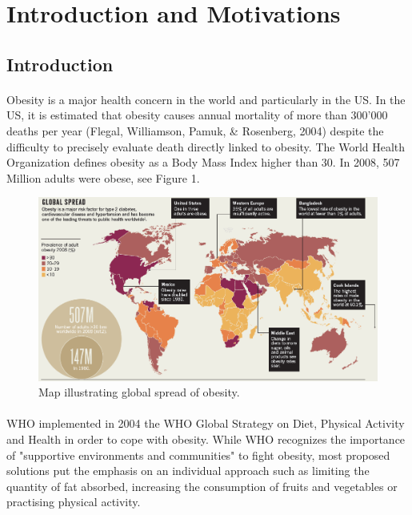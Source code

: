 \documentclass[11pt]{article}
\begin{document}
\section{Introduction and Motivations}

\subsection{Introduction}
\paragraph{}
Obesity is a major health concern in the world and particularly in the US. In the US, it is estimated that obesity causes annual mortality of more than 300'000 deaths per year (Flegal, Williamson, Pamuk, \& Rosenberg, 2004) despite the difficulty to precisely evaluate death directly linked to obesity. The World Health Organization defines obesity as a Body Mass Index higher than 30. In 2008, 507 Million adults were obese, see Figure 1.
\begin{figure}[!h]
\center
   \includegraphics[width=\textwidth,keepaspectratio]{Nature_p50_Global_spread_of_obesity.png}
   \caption{\label{4} Map illustrating global spread of obesity.}
\end{figure}
\paragraph{}
WHO implemented in 2004 the WHO Global Strategy on Diet, Physical Activity and Health in order to cope with obesity. While WHO recognizes the importance of "supportive environments and communities" to fight obesity, most proposed solutions put the emphasis on an individual approach such as limiting the quantity of fat absorbed, increasing the consumption of fruits and vegetables or practising physical activity. 
\end{document}
